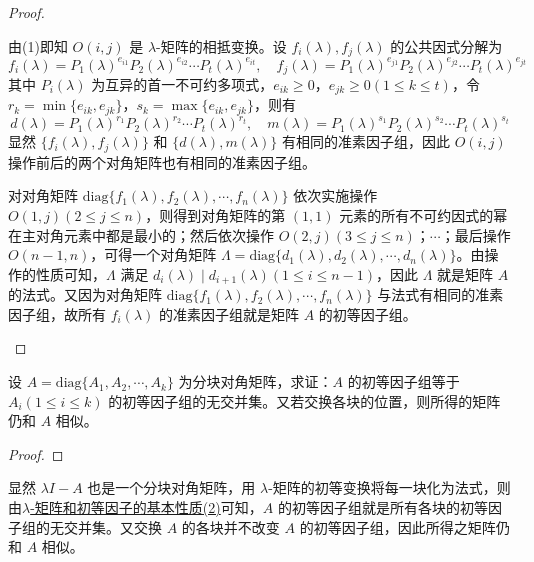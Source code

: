 \documentclass[../../main.tex]{subfiles}
\begin{document}
\begin{proof}
\begin{enumerate}[(1)]
由(1)即知 \(O(i,j)\) 是 \(\lambda\)-矩阵的相抵变换。设 \(f_i(\lambda),f_j(\lambda)\) 的公共因式分解为
\[
f_i(\lambda)=P_1(\lambda)^{e_{i1}}P_2(\lambda)^{e_{i2}}\cdots P_t(\lambda)^{e_{it}}, \quad f_j(\lambda)=P_1(\lambda)^{e_{j1}}P_2(\lambda)^{e_{j2}}\cdots P_t(\lambda)^{e_{jt}}
\]
其中 \(P_i(\lambda)\) 为互异的首一不可约多项式，\(e_{ik}\geq0\)，\(e_{jk}\geq0(1\leq k\leq t)\)，令 \(r_k = \min\{e_{ik},e_{jk}\}\)，\(s_k = \max\{e_{ik},e_{jk}\}\)，则有
\[
d(\lambda)=P_1(\lambda)^{r_1}P_2(\lambda)^{r_2}\cdots P_t(\lambda)^{r_t}, \quad m(\lambda)=P_1(\lambda)^{s_1}P_2(\lambda)^{s_2}\cdots P_t(\lambda)^{s_t}
\]
显然 \(\{f_i(\lambda),f_j(\lambda)\}\) 和 \(\{d(\lambda),m(\lambda)\}\) 有相同的准素因子组，因此 \(O(i,j)\) 操作前后的两个对角矩阵也有相同的准素因子组。

对对角矩阵 \(\mathrm{diag}\{f_1(\lambda),f_2(\lambda),\cdots,f_n(\lambda)\}\) 依次实施操作 \(O(1,j)(2\leq j\leq n)\)，则得到对角矩阵的第 \((1,1)\) 元素的所有不可约因式的幂在主对角元素中都是最小的；然后依次操作 \(O(2,j)(3\leq j\leq n)\)；\(\cdots\)；最后操作 \(O(n - 1,n)\)，可得一个对角矩阵 \(\varLambda=\mathrm{diag}\{d_1(\lambda),d_2(\lambda),\cdots,d_n(\lambda)\}\)。由操作的性质可知，\(\varLambda\) 满足 \(d_i(\lambda)\mid d_{i + 1}(\lambda)(1\leq i\leq n - 1)\)，因此 \(\varLambda\) 就是矩阵 \(A\) 的法式。又因为对角矩阵 \(\mathrm{diag}\{f_1(\lambda),f_2(\lambda),\cdots,f_n(\lambda)\}\) 与法式有相同的准素因子组，故所有 \(f_i(\lambda)\) 的准素因子组就是矩阵 \(A\) 的初等因子组。
\end{enumerate}
\end{proof}

\begin{proposition}
设 \(A = \mathrm{diag}\{A_1,A_2,\cdots,A_k\}\) 为分块对角矩阵，求证：\(A\) 的初等因子组等于 \(A_i(1\leq i\leq k)\) 的初等因子组的无交并集。又若交换各块的位置，则所得的矩阵仍和 \(A\) 相似。
\end{proposition}
\begin{proof}
\end{proof}
显然 \(\lambda I - A\) 也是一个分块对角矩阵，用 \(\lambda\)-矩阵的初等变换将每一块化为法式，则由\hyperref[theorem:lambda-矩阵和初等因子的基本性质]{$\lambda$-矩阵和初等因子的基本性质(2)}可知，\(A\) 的初等因子组就是所有各块的初等因子组的无交并集。又交换 \(A\) 的各块并不改变 \(A\) 的初等因子组，因此所得之矩阵仍和 \(A\) 相似。
\end{document}
